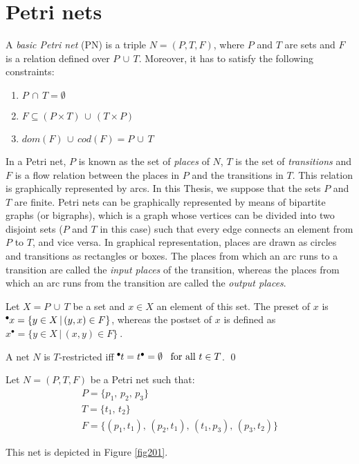 \section{Petri nets}

\begin{definition} 
A \emph{basic Petri net} (PN) is a triple $N=(P,T,F)$, where $P$ and $T$
are sets and $F$ is a relation defined over $P \,\cup\,T$. Moreover, it has to satisfy
the following constraints:
\begin{enumerate}
\item $P \,\cap \,T = \emptyset$
\item $F \subseteq (P \times T) \,\cup\, (T \times P)$
\item $dom(F) \, \cup \, cod(F) = P \, \cup \, T$
\end{enumerate}

In a Petri net, $P$ is known as the set of \emph{places} of $N$, $T$ 
is the set of {\it transitions} and $F$ is a flow relation between the places in $P$
and the transitions in $T$. This relation is graphically represented by arcs.
In this Thesis, we suppose that the sets $P$ and $T$ are finite. Petri nets
can be graphically represented by means of bipartite graphs (or bigraphs), which
is a graph whose vertices can be divided into two disjoint sets ($P$ and $T$ in this case) such that 
every edge connects an element from $P$ to $T$, and vice versa. In graphical representation, places are drawn
as circles and transitions as rectangles or boxes.  The places 
from which an arc runs to a transition are called the \emph{input places} of the transition, whereas
the places from which an arc runs from the transition are called the \emph{output places}.

Let $X = P\,\cup\,T$ be a set and $x \in X$
an element of this set. The preset of $x$ is
$\hspace*{-0.4em}~^{\bullet} \hspace*{-0.05em}x = \{ y \in X \,|\, (y,x) \in F\}$, whereas the postset of $x$ 
is defined as $x^{\bullet} = \{ y \in X \,|\, (x,y) \in F\}~$.

A net $N$ is $T$-restricted iff $\hspace*{-0.4em}~^{\bullet} \hspace*{-0.05em}t = t^{\bullet} =
\emptyset\,\,\,\ \text{for all } t \in T$.
\qed
\end{definition}

\begin{example} Let $N=(P,T,F)$ be a Petri net such that:
\[\begin{array}{l}
P = \{ p_1,\,p_2,\,p_3\}\\
T = \{ t_1,\,t_2\}\\
F = \{ (p_1,t_1),\,(p_2,t_1),\,(t_1,p_3),\,(p_3,t_2)\}
\end{array}\]

This net is depicted in Figure \ref{fig201}.
\end{example}

